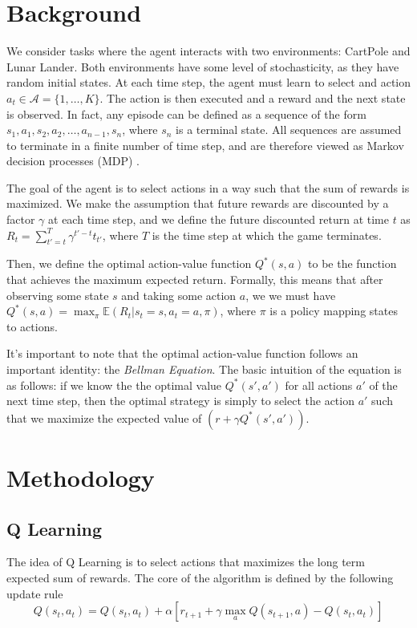 \documentclass{article}
\newcommand{\e}[1]{\mathbb{E}(#1)}
\begin{document}
\section{Background}

We consider tasks where the agent interacts with two environments: CartPole and
Lunar Lander. Both environments have some level of stochasticity, as they have
random initial states. At each time step, the agent must learn to select and
action \(a_t \in \mathcal{A} = \{1, \hdots, K\}\). The action is then executed
and a reward and the next state is observed. In fact, any episode can be
defined as a sequence of the form \(s_1, a_1, s_2, a_2, \hdots, a_{n-1}, s_n\),
where \(s_n\) is a terminal state. All sequences are assumed to terminate in a
finite number of time step, and are therefore viewed as Markov decision
processes (MDP) \cite{DBLP:journals/corr/MnihKSGAWR13}.

The goal of the agent is to select actions in a way such that the sum of
rewards is maximized. We make the assumption that future rewards are discounted
by a factor \(\gamma\) at each time step, and we define the future discounted
return at time \(t\) as \(R_t = \sum_{t' = t}^{T} \gamma^{t' - t}t_{t'}\),
where \(T\) is the time step at which the game terminates.

Then, we define the optimal action-value function \(Q^*(s,a)\) to be the
function that achieves the maximum expected return. Formally, this means that
after observing some state \(s\) and taking some action \(a\), we we must have
\(Q^*(s,a) = \max_\pi \e{R_t | s_t = s, a_t = a, \pi}\), where \(\pi\) is a
policy mapping states to actions.

It's important to note that the optimal action-value function follows an
important identity: the \emph{Bellman Equation}. The basic intuition of the
equation is as follows: if we know the the optimal value \(Q^*(s',a')\) for all
actions \(a'\) of the next time step, then the optimal strategy is simply to
select the action \(a'\) such that we maximize the expected value of \((r +
\gamma Q^*(s',a'))\).

\section{Methodology}
\subsection{Q Learning}
The idea of Q Learning is to select actions that maximizes the long term
expected sum of rewards. The core of the algorithm is defined by the following
update rule
\begin{equation}
      Q(s_t, a_t) = Q(s_t, a_t) + \alpha \left[r_{t+1} + \gamma \max_{a} Q(s_{t+1}, a) - Q(s_t, a_t)\right]
      \label{eq:q_update_rule}
\end{equation}
\end{document}
